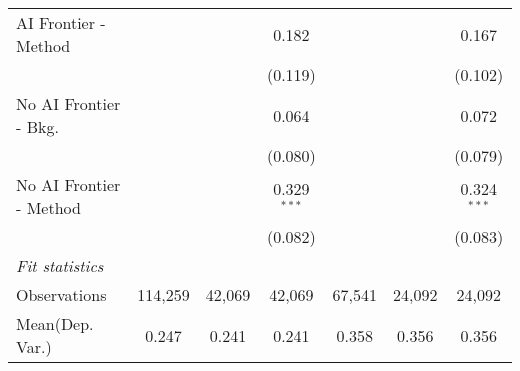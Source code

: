 \begin{tabular}{lcccccc}
   AI Frontier - Method    &               &               & 0.182         &               &               & 0.167\\   
                           &               &               & (0.119)       &               &               & (0.102)\\   
   No AI Frontier - Bkg.   &               &               & 0.064         &               &               & 0.072\\   
                           &               &               & (0.080)       &               &               & (0.079)\\   
   No AI Frontier - Method &               &               & 0.329$^{***}$ &               &               & 0.324$^{***}$\\   
                           &               &               & (0.082)       &               &               & (0.083)\\   
   \midrule
   \emph{Fit statistics}\\
   Observations            & 114,259       & 42,069        & 42,069        & 67,541        & 24,092        & 24,092\\  
Mean(Dep. Var.) & 0.247 & 0.241 & 0.241 & 0.358 & 0.356 & 0.356 \\
   

\end{tabular}
